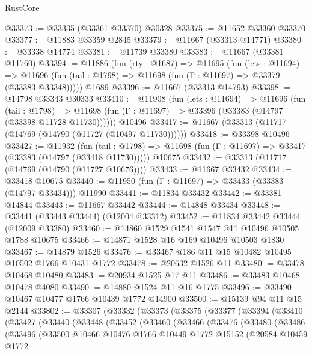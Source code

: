 \begin{lexlean}{RustCore}
\begin{coremodule}
@33373 := @33335 (@33361 @33370) @30328
@33375 := @11652 @33360 @33370
@33377 := @11883 @33359 @2845
@33379 := @11667 (@33313 @14771)
@33380 := @33338 @14774
@33381 := @11739 @33380
@33383 := @11667 (@33381 @11760)
@33394 := @11886
    (fun (rty : @1687) =>
    @11695
      (fun (lets : @11694) =>
      @11696 (fun (tail : @1798) => @11698 (fun (Γ : @11697) => @33379 (@33383 @33348)))))
    @1689
@33396 := @11667 (@33313 @14793)
@33398 := @14798 @33343 @30333
@33410 := @11908
    (fun (lets : @11694) =>
    @11696
      (fun (tail : @1798) =>
      @11698 (fun (Γ : @11697) => @33396 (@33383 (@14797 (@33398 @11728 @11730))))))
    @10496
@33417 := @11667 (@33313 (@11717 (@14769 (@14790 (@11727 (@10497 @11730))))))
@33418 := @33398 @10496
@33427 := @11932
    (fun (tail : @1798) => @11698 (fun (Γ : @11697) => @33417 (@33383 (@14797 (@33418 @11730)))))
    @10675
@33432 := @33313 (@11717 (@14769 (@14790 (@11727 @10676))))
@33433 := @11667 @33432
@33434 := @33418 @10675
@33440 := @11950 (fun (Γ : @11697) => @33433 (@33383 (@14797 @33434))) @11990
@33441 := @11834 @33432
@33442 := @33381 @14844
@33443 := @11667 @33442
@33444 := @14848 @33434
@33448 := @33441 (@33443 @33444) (@12004 @33312)
@33452 := @11834 @33442 @33444 (@12009 @33380)
@33460 := @14860 @1529 @1541 @1547 @11 @10496 @10505 @1788 @10675
@33466 := @14871 @1528 @16 @169 @10496 @10503 @1830
@33467 := @14879 @1526
@33476 := @33467 @186 @11 @15 @10482 @10495 @10502 @1766 @10431 @1772
@33478 := @20632 @1526 @11
@33480 := @33478 @10468 @10480
@33483 := @20934 @1525 @17 @11
@33486 := @33483 @10468 @10478 @4080
@33490 := @14880 @1524 @11 @16 @1775
@33496 := @33490 @10467 @10477 @1766 @10439 @1772 @14900
@33500 := @15139 @94 @11 @15 @2144
@33802 := @33307
    (@33332
      (@33373
        (@33375
          (@33377
            (@33394
              (@33410
                (@33427
                  (@33440
                    (@33448
                      (@33452
                        (@33460
                          (@33466
                            (@33476
                              (@33480
                                (@33486
                                  (@33496
                                    (@33500
                                      @10466
                                      @10476
                                      @1766
                                      @10449
                                      @1772
                                      @15152
                                      (@20584
                                        @10459
                                        @1772

\end{coremodule}
\end{lexlean}
